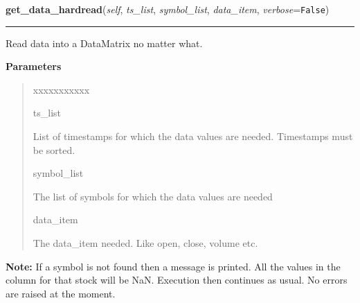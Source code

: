     \vspace{0.5ex}

\hspace{.8\funcindent}\begin{boxedminipage}{\funcwidth}

    \raggedright \textbf{get\_data\_hardread}(\textit{self}, \textit{ts\_list}, \textit{symbol\_list}, \textit{data\_item}, \textit{verbose}={\tt False})

    \vspace{-1.5ex}

    \rule{\textwidth}{0.5\fboxrule}
\setlength{\parskip}{2ex}
    Read data into a DataMatrix no matter what.

\setlength{\parskip}{1ex}
      \textbf{Parameters}
      \vspace{-1ex}

      \begin{quote}
        \begin{Ventry}{xxxxxxxxxxx}

          \item[ts\_list]

          List of timestamps for which the data values are needed. 
          Timestamps must be sorted.

          \item[symbol\_list]

          The list of symbols for which the data values are needed

          \item[data\_item]

          The data\_item needed. Like open, close, volume etc.

        \end{Ventry}

      \end{quote}

\textbf{Note:} If a symbol is not found then a message is printed. All the values in the 
column for that stock will be NaN. Execution then continues as usual. No 
errors are raised at the moment.



    \end{boxedminipage}

    \label{trunk:qstkutil:DataAccess:DataAccess:get_data}

